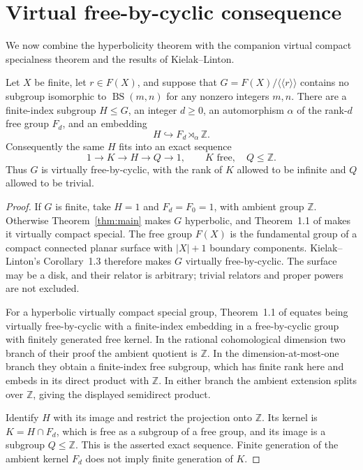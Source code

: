 \section{Virtual free-by-cyclic consequence}\label{sec:free-by-cyclic}

We now combine the hyperbolicity theorem with the companion virtual
compact specialness theorem and the results of Kielak--Linton.

\begin{corollary}\label{cor:free-by-cyclic}
Let $X$ be finite, let $r\in F(X)$, and suppose that
$G=F(X)/\langle\!\langle r\rangle\!\rangle$ contains no subgroup
isomorphic to $\operatorname{BS}(m,n)$ for any nonzero integers $m,n$.
There are a finite-index subgroup $H\leq G$, an integer $d\geq0$, an
automorphism $\alpha$ of the rank-$d$ free group $F_d$, and an embedding
\[
H\hookrightarrow F_d\rtimes_\alpha\mathbb Z.
\]
Consequently the same $H$ fits into an exact sequence
\[
1\longrightarrow K\longrightarrow H\longrightarrow Q\longrightarrow1,
\qquad K\text{ free},\quad Q\leq\mathbb Z.
\]
Thus $G$ is virtually free-by-cyclic, with the rank of $K$ allowed to be
infinite and $Q$ allowed to be trivial.
\end{corollary}

\begin{proof}
If $G$ is finite, take $H=1$ and $F_d=F_0=1$, with ambient group
$\mathbb Z$. Otherwise Theorem~\ref{thm:main} makes $G$ hyperbolic,
and Theorem~1.1 of \cite{OpenAIVirtualSpecialness} makes it virtually
compact special. The free group $F(X)$ is the fundamental group of a
compact connected planar surface with $|X|+1$ boundary components.
Kielak--Linton's Corollary~1.3
\cite{KielakLinton2024Virtually} therefore makes $G$ virtually
free-by-cyclic. The surface may be a disk, and their relator is
arbitrary; trivial relators and proper powers are not excluded.

For a hyperbolic virtually compact special group, Theorem~1.1 of
\cite{KielakLinton2024Virtually} equates being virtually free-by-cyclic
with a finite-index embedding in a free-by-cyclic group with finitely
generated free kernel. In the
rational cohomological dimension two branch of their proof the ambient
quotient is $\mathbb Z$. In the dimension-at-most-one branch they
obtain a finite-index free subgroup, which has finite rank here and
embeds in its direct product with $\mathbb Z$. In either branch the
ambient extension splits over $\mathbb Z$, giving the displayed
semidirect product.

Identify $H$ with its image and restrict the projection onto
$\mathbb Z$. Its kernel is $K=H\cap F_d$, which is free as a subgroup
of a free group, and its image is a subgroup $Q\leq\mathbb Z$. This is
the asserted exact sequence. Finite generation of the ambient kernel
$F_d$ does not imply finite generation of $K$.
\end{proof}

